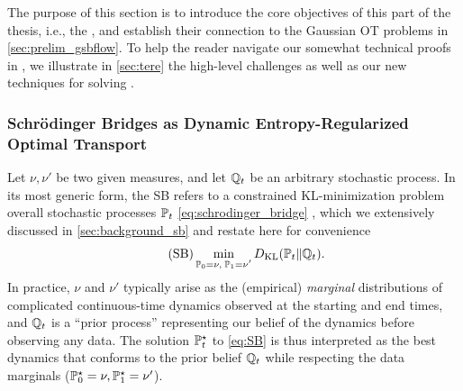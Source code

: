 The purpose of this section is to introduce the core objectives of this part of the thesis, i.e., the , and establish their connection to the Gaussian \acrshort{OT} problems in \cref{sec:prelim_gsbflow}. To help the reader navigate our somewhat technical proofs in ,  we illustrate in \cref{sec:tere} the high-level challenges as well as our new techniques for solving .

\subsubsection{Schr{\"o}dinger Bridges as Dynamic Entropy-Regularized Optimal Transport}


Let $\nu, \nu'$ be two given measures, and let $\refpro$ be an arbitrary stochastic process. In its most generic form, the \acrlong{SB} refers to a constrained KL-minimization problem overall stochastic processes $\Pmargin$ \eqref{eq:schrodinger_bridge} \citep{leonard2013survey, chen2021stochastic}, which we extensively discussed in \cref{sec:background_sb} and restate here for convenience
\begin{equation}
\label{eq:SB}
\tag{SB}
\min_{ \substack{ \Pinit = \nu, \; \Pend = \nu'} } \KL(\Pmargin \|\refpro).%
\end{equation}
In practice, $\nu$ and $\nu'$ typically arise as the (empirical) \emph{marginal} distributions of complicated continuous-time dynamics observed at the starting and end times, and $\refpro$ is a ``prior process'' representing our belief of the dynamics before observing any data. The solution $\Pstar$ to \eqref{eq:SB} is thus interpreted as the best dynamics that conforms to the prior belief $\refpro$ while respecting the data marginals ($\Pstar[0] = \nu, \Pstar[\horizon] = \nu'$). 


